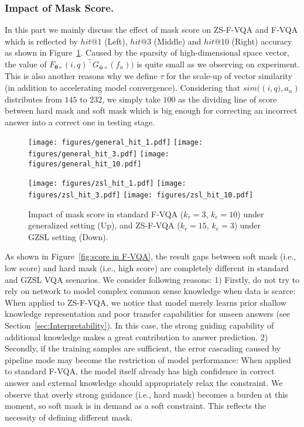 \documentclass[runningheads]{llncs}
\begin{document}
\subsubsection{Impact of Mask Score.} \label{sec:Impact of mask score}
In this part we mainly discuss the effect of mask score on ZS-F-VQA and F-VQA which is reflected by $hit@1$ (Left), $hit@3$ (Middle) and $hit@10$ (Right) accuracy as shown in Figure~\ref{fig:score in ZS-F-VQA}.
Caused by the sparsity of high-dimensional space vector, the value of $F_{\boldsymbol{\theta\diamond}}(i, q)^{\top} G_{\boldsymbol{\phi\diamond}}(f_n))$ is quite small as we observing on experiment. 
This is also another reasons why we define $\tau$ for the scale-up of vector similarity (in addition to accelerating model convergence).
Considering that $sim(\left(i,q),a_n\right)$ distributes from $145$ to $232$, we simply take $100$ as the dividing line of score between hard mask and soft mask which is big enough for correcting an incorrect answer into a correct one in testing stage.
\begin{figure}[htbp]
\centering
\texttt{[image: figures/general\_hit\_1.pdf]} 
\texttt{[image: figures/general\_hit\_3.pdf]}
\texttt{[image: figures/general\_hit\_10.pdf]}

\texttt{[image: figures/zsl\_hit\_1.pdf]} 
\texttt{[image: figures/zsl\_hit\_3.pdf]}
\texttt{[image: figures/zsl\_hit\_10.pdf]}
\caption{Impact of mask score in standard F-VQA ($k_r = 3$, $k_e = 10$) under generalized setting (Up), and ZS-F-VQA ($k_r = 15$, $k_e = 3$) under GZSL setting (Down).}
\label{fig:score in F-VQA}
\label{fig:score in ZS-F-VQA}
\end{figure}
As shown in Figure~\ref{fig:score in F-VQA}, the result gaps between soft mask (i.e., low score) and hard mask (i.e., high score)  are completely different in standard and GZSL VQA scenarios.
We consider following reasons:
1) Firstly, do not try to rely on network to model complex common sense knowledge when data is scarce: 
When applied to ZS-F-VQA, we notice that model merely learns prior shallow knowledge representation and poor transfer capabilities for unseen answers (see Section~\ref{sec:Interpretability}). In this case, the strong guiding capability of additional knowledge makes a great contribution to answer prediction.
2) Secondly, if the training samples are sufficient, the error cascading caused by pipeline mode may become the restriction of model performance: 
When applied to standard F-VQA, the model itself already has high confidence in correct answer and external knowledge should appropriately relax the constraint. 
We observe that overly strong guidance (i.e., hard mask) becomes a burden at this moment, so soft mask is in demand as a soft constraint.
This reflects the necessity of defining different mask.
\end{document}
